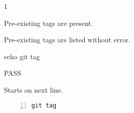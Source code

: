 \begin{description}[align=right,leftmargin=3.2cm,labelindent=3.0cm]
\item[Step:] 1
\item[Confirm:] Pre-existing tags are present.
\item[Expectation:] Pre-existing tags are listed without error.
\item[Command:] echo git  tag
\item[Test Result:] PASS
\item[Evidence:] Starts on next line.
\end{description}
\begin{lstlisting}[numbers=left]
git tag

\end{lstlisting}
